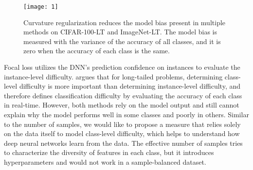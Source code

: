 \documentclass[10pt,twocolumn,letterpaper]{article}
\begin{document}
\begin{figure}[t]
\vskip -0.15in
\centering
\centerline{\texttt{[image: 1]}}
\vskip -0.1in
\caption{Curvature regularization reduces the model bias present in multiple methods on CIFAR-100-LT and ImageNet-LT. The model bias is measured with the variance of the accuracy of all classes, and it is zero when the accuracy of each class is the same.}
\label{fig1}
\vskip -0.2in
\end{figure}

\renewcommand{\thefootnote}{}

Focal loss \cite{paper3} utilizes the DNN's prediction confidence on instances to evaluate the instance-level difficulty. \cite{paper27} argues that for long-tailed problems, determining class-level difficulty is more important than determining instance-level difficulty, and therefore defines classification difficulty by evaluating the accuracy of each class in real-time. However, both methods rely on the model output and still cannot explain why the model performs well in some classes and poorly in others. Similar to the number of samples, we would like to propose a measure that relies solely on the data itself to model class-level difficulty, which helps to understand how deep neural networks learn from the data. The effective number of samples \cite{paper4} tries to characterize the diversity of features in each class, but it introduces hyperparameters and would not work in a sample-balanced dataset.
\end{document}
